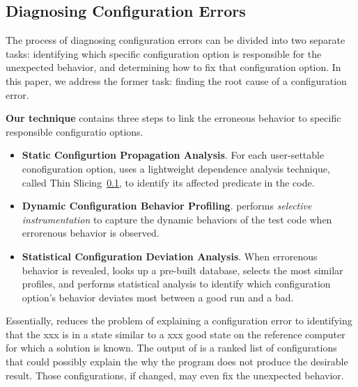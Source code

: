 





\subsection{Diagnosing Configuration Errors}

The process of diagnosing configuration errors can be divided into two
separate tasks: identifying which specific configuration option is
responsible for the unexpected behavior, and determining how to fix that
configuration option. In this paper, we address the former task: finding
the root cause of a configuration error.

\textbf{Our technique} contains three steps to 
link the erroneous behavior to specific responsible configuratio options.

\begin{itemize}
\item \textbf{Static Configurtion Propagation Analysis}. For
each user-settable conofiguration option, \ourtool
uses a lightweight dependence analysis technique, called Thin Slicing~\ref{},
to identify its affected predicate in the code.

\item \textbf{Dynamic Configuration Behavior Profiling}. \ourtool
performs \textit{selective instrumentation} to capture the
dynamic behaviors of the test code when errorenous behavior
is observed.

\item \textbf{Statistical Configuration Deviation Analysis}.
When errorenous behavior is revealed, \ourtool looks up a
pre-built database, selects the most similar profiles, and
performs statistical analysis to identify which configuration
option's behavior deviates most between a good run and a bad.

\end{itemize}

Essentially, \ourtool reduces the problem of explaining a
configuration error to
identifying that the xxx is in a state similar to a xxx good state
on the reference computer for which a solution is known.
The output of \ourtool is a ranked list of
configurations that could possibly explain the why the program does not produce the desirable result. Those
configurations, if changed, may even fix the unexpected behavior.

